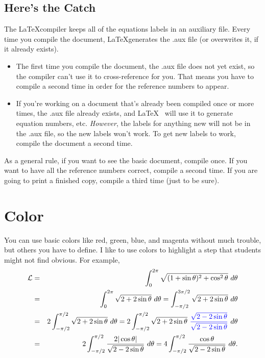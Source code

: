 \documentclass[12pt]{report} %
\newcommand{\bi}{\begin{itemize}}		%
\newcommand{\ei}{\end{itemize}}		%
\begin{document}
\subsection{Here's the Catch}

The \LaTeX compiler keeps all of the equations labels in an auxiliary file.  Every 
time you compile the document, \LaTeX generates the .aux file (or overwrites it, 
if it already exists).  

\bi
\item The first time you compile the document, the .aux file does not yet exist, 
so the compiler can't use it to cross-reference for you.  That means you have to 
compile a second time in order for the reference numbers to appear.

\item If you're working on a document that's already been compiled once or more 
times, the .aux file already exists, and \LaTeX~ will use it to generate equation 
numbers, etc.  {\it However}, the labels for anything new will not be in the .aux 
file, so the new labels won't work.  To get new labels to work, compile the document 
a second time.
\ei

As a general rule, if you want to see the basic document, compile once.  If you 
want to have all the reference numbers correct, compile a second time.  If you 
are going to print a finished copy, compile a third time (just to be sure).

\setcounter{chapter}{6}
\section{Color}
You can use basic colors like red, green, blue, and magenta without much trouble, 
but others you have to define.  I like to use colors to highlight a step that students 
might not find obvious.  For example,
\begin{eqnarray*}
{\mathcal{L}} & = & \int_0^{2\pi} \sqrt{ (1 + \sin \theta)^2 + \cos^2\theta}~d\theta \\
& = & 
\int_0^{2\pi} \sqrt{2 + 2\sin \theta}~d\theta
= 
\int_{-\pi/2}^{3\pi/2} \sqrt{2 + 2\sin \theta}~d\theta\\
& = & 
2\int_{-\pi/2}^{\pi/2} \sqrt{2 + 2\sin \theta}~d\theta
 = 
2\int_{-\pi/2}^{\pi/2} \sqrt{2 + 2\sin \theta}~{\color{blue}
\frac{\sqrt{2 - 2\sin\theta}}{\sqrt{2 - 2\sin\theta}}}~ d\theta \\
& = & 
2\int_{-\pi/2}^{\pi/2} \frac{2|\cos \theta|}{\sqrt{2 - 2\sin\theta}}~d\theta
 = 
4\int_{-\pi/2}^{\pi/2} \frac{\cos \theta}{\sqrt{2 - 2\sin\theta}}~d\theta .
\end{eqnarray*}
\end{document}
